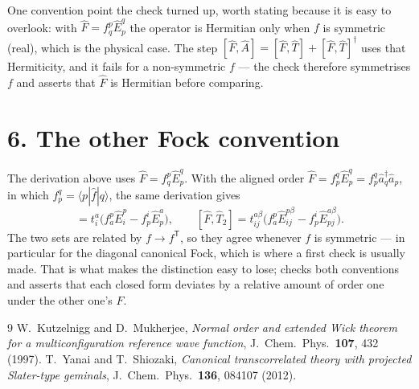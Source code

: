 \documentclass[11pt]{article}
\newcommand{\E}[2]{\hat E^{#1}_{#2}}
\newcommand{\occ}{i}
\newcommand{\vir}{a}
\begin{document}
One convention point the check turned up, worth stating because it is easy to
overlook: with $\hat F=f^p_q\E{q}{p}$ the operator is Hermitian only when $f$ is
symmetric (real), which is the physical case. The step
$[\hat F,\hat A]=[\hat F,\hat T]+[\hat F,\hat T]^\dagger$ uses that
Hermiticity, and it fails for a non-symmetric $f$ --- the check therefore
symmetrises $f$ and asserts that $\hat F$ is Hermitian before comparing.

\section*{6. The other Fock convention}

The derivation above uses $\hat F=f^p_q\E{q}{p}$. With the aligned order
$\hat F=f^q_p\E{q}{p}=f^q_p\hat a^\dagger_q\hat a_p$, in which
$f^q_p=\langle p|\hat f|q\rangle$, the same derivation gives
\begin{equation}
  [\hat F,\hat T_1]=t^\vir_\occ\bigl(f^p_\vir\E{p}{\occ}-f^\occ_p\E{\vir}{p}\bigr),
  \qquad
  [\hat F,\hat T_2]=t^{\vir\beta}_{\occ j}\bigl(f^p_\vir\E{p\beta}{\occ j}
   -f^\occ_p\E{\vir\beta}{pj}\bigr).
  \label{eq:aligned}
\end{equation}
The two sets are related by $f\to f^{\mathsf T}$, so they agree whenever $f$ is
symmetric --- in particular for the diagonal canonical Fock, which is where a
first check is usually made. That is what makes the distinction easy to lose;
 checks both conventions and asserts that
each closed form deviates by a relative amount of order one under the other
one's $\hat F$.

\begin{thebibliography}{9}
 W.~Kutzelnigg and D.~Mukherjee,
  \emph{Normal order and extended Wick theorem for a multiconfiguration
  reference wave function}, J.~Chem.~Phys.\ \textbf{107}, 432 (1997).
 T.~Yanai and T.~Shiozaki,
  \emph{Canonical transcorrelated theory with projected Slater-type geminals},
  J.~Chem.~Phys.\ \textbf{136}, 084107 (2012).
\end{thebibliography}
\end{document}
